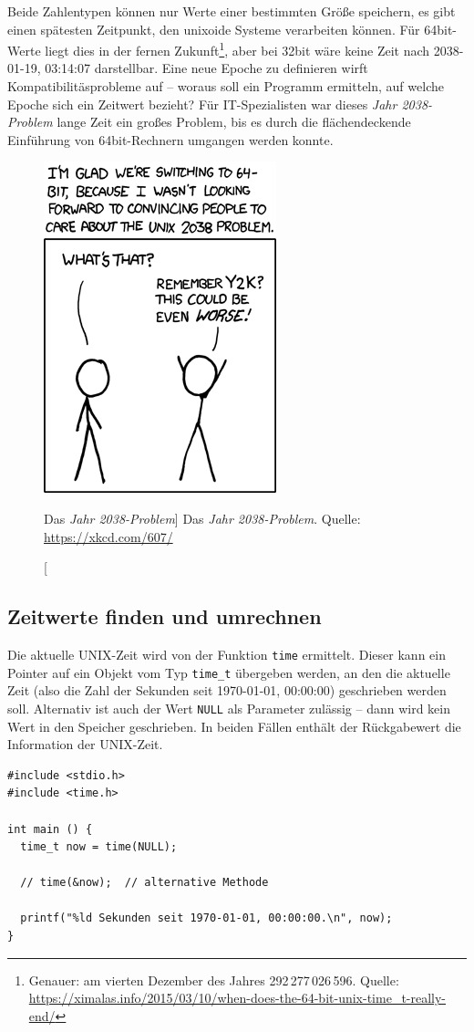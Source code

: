 Beide Zahlentypen können nur Werte einer bestimmten Größe speichern, \ie es gibt einen spätesten Zeitpunkt, den unixoide Systeme verarbeiten können. Für 64bit-Werte liegt dies in der fernen Zukunft\footnote{Genauer: am vierten Dezember des Jahres 292\,277\,026\,596. Quelle: \url{https://ximalas.info/2015/03/10/when-does-the-64-bit-unix-time_t-really-end/}}, aber bei 32bit wäre keine Zeit nach 2038-01-19, 03:14:07 darstellbar. Eine neue Epoche zu definieren wirft Kompatibilitäsprobleme auf -- woraus soll ein Programm ermitteln, auf welche Epoche sich ein Zeitwert bezieht? Für IT-Spezialisten war dieses \emph{Jahr 2038-Problem} lange Zeit ein großes Problem, bis es durch die flächendeckende Einführung von 64bit-Rechnern umgangen werden konnte.

\begin{figure}
\begin{center}
	\includegraphics[width=.3\linewidth]{./gfx/xkcd-2038}
	\caption
	[Das \emph{Jahr 2038-Problem}]
	{Das \emph{Jahr 2038-Problem}. Quelle: \url{https://xkcd.com/607/}}
\end{center}
\end{figure}

\subsection{Zeitwerte finden und umrechnen}
Die aktuelle UNIX-Zeit wird von der Funktion \texttt{time} ermittelt. Dieser kann ein Pointer auf ein Objekt vom Typ \texttt{time_t} übergeben werden, an den die aktuelle Zeit (also die Zahl der Sekunden seit 1970-01-01, 00:00:00) geschrieben werden soll. Alternativ ist auch der Wert \texttt{NULL} als Parameter zulässig -- dann wird kein Wert in den Speicher geschrieben. In beiden Fällen enthält der Rückgabewert die Information der UNIX-Zeit.

\begin{codebox}
\begin{verbatim}
#include <stdio.h>
#include <time.h>

int main () {
  time_t now = time(NULL);
  
  // time(&now);  // alternative Methode
  
  printf("%ld Sekunden seit 1970-01-01, 00:00:00.\n", now);
}
\end{verbatim}
\end{codebox}

